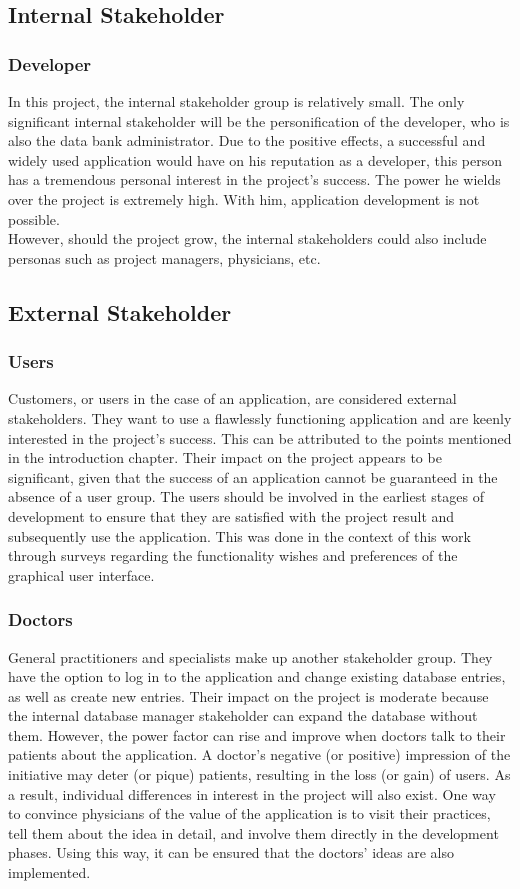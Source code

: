 \subsection{Internal Stakeholder}
\subsubsection{Developer}
In this project, the internal stakeholder group is relatively small. The only significant internal stakeholder will be the personification of the developer, who is also the data bank administrator. Due to the positive effects, a successful and widely used application would have on his reputation as a developer, this person has a tremendous personal interest in the project's success. The power he wields over the project is extremely high. With him, application development is not possible.
\newline \\ 
However, should the project grow, the internal stakeholders could also include personas such as project managers, physicians, etc.
\subsection{External Stakeholder}
\subsubsection{Users}
Customers, or users in the case of an application, are considered external stakeholders. They want to use a flawlessly functioning application and are keenly interested in the project's success. This can be attributed to the points mentioned in the introduction chapter. Their impact on the project appears to be significant, given that the success of an application cannot be guaranteed in the absence of a user group.
The users should be involved in the earliest stages of development to ensure that they are satisfied with the project result and subsequently use the application. This was done in the context of this work through surveys regarding the functionality wishes and preferences of the graphical user interface.

\subsubsection{Doctors}
General practitioners and specialists make up another stakeholder group. They have the option to log in to the application and change existing database entries, as well as create new entries. Their impact on the project is moderate because the internal database manager stakeholder can expand the database without them. However, the power factor can rise and improve when doctors talk to their patients about the application. A doctor's negative (or positive) impression of the initiative may deter (or pique) patients, resulting in the loss (or gain) of users. As a result, individual differences in interest in the project will also exist. One way to convince physicians of the value of the application is to visit their practices, tell them about the idea in detail, and involve them directly in the development phases. Using this way, it can be ensured that the doctors' ideas are also implemented.

